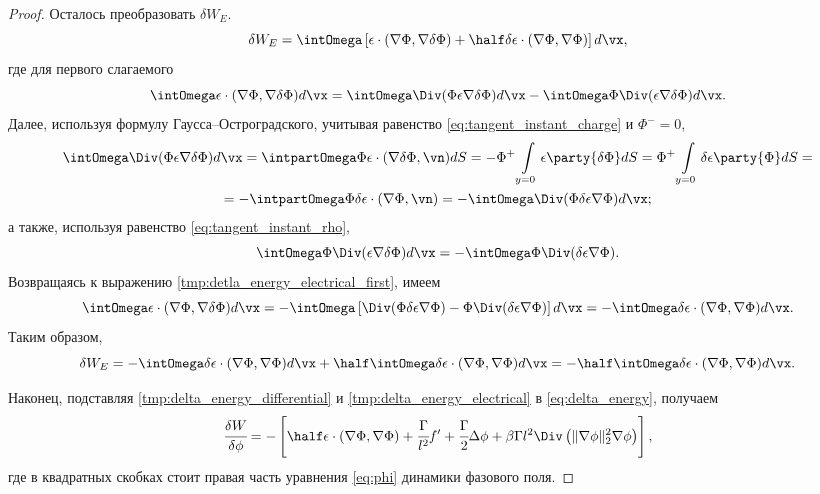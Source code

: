\begin{proof}
Осталось преобразовать $\delta W_E$.
\[
    \delta W_E = \intOmega \left[ \epsilon \cdot (\nabla \Phi, \nabla \delta \Phi) + \half \delta \epsilon \cdot (\nabla \Phi, \nabla \Phi) \right] d \vx,
\]
где для первого слагаемого
\begin{equation}
    \intOmega \epsilon \cdot (\nabla \Phi, \nabla \delta \Phi) d \vx = \intOmega \Div (\Phi \epsilon \nabla \delta \Phi) d \vx - \intOmega \Phi \Div (\epsilon \nabla \delta \Phi) d \vx.
    \label{tmp:detla_energy_electrical_first}
\end{equation}
Далее, используя формулу Гаусса--Остроградского, учитывая равенство \eqref{eq:tangent_instant_charge} и $\Phi^- = 0$,
\begin{multline*}
    \intOmega \Div (\Phi \epsilon \nabla \delta \Phi) d \vx = \intpartOmega \Phi \epsilon \cdot (\nabla \delta \Phi, \vn) dS = -\Phi^+ \int\limits_{y = 0} \epsilon \party{\delta \Phi} dS = \Phi^+ \int\limits_{y = 0} \delta \epsilon \party{\Phi} dS = \\ = -\intpartOmega \Phi \delta \epsilon \cdot (\nabla \Phi, \vn) = -\intOmega \Div(\Phi \delta \epsilon \nabla \Phi) d \vx;
\end{multline*}
а также, используя равенство \eqref{eq:tangent_instant_rho},
\[
    \intOmega \Phi \Div (\epsilon \nabla \delta \Phi) d \vx = -\intOmega \Phi \Div(\delta \epsilon \nabla \Phi).
\]
Возвращаясь к выражению \eqref{tmp:detla_energy_electrical_first}, имеем
\[
    \intOmega \epsilon \cdot (\nabla \Phi, \nabla \delta \Phi) d \vx = -\intOmega \left[ \Div(\Phi \delta \epsilon \nabla \Phi) - \Phi \Div(\delta \epsilon \nabla \Phi) \right] d \vx = -\intOmega \delta \epsilon \cdot (\nabla \Phi, \nabla \Phi) d \vx.
\]
Таким образом,
\begin{equation}
    \delta W_E = -\intOmega \delta \epsilon \cdot (\nabla \Phi, \nabla \Phi) d \vx + \half \intOmega \delta \epsilon \cdot (\nabla \Phi, \nabla \Phi) d \vx = -\half \intOmega \delta \epsilon \cdot (\nabla \Phi, \nabla \Phi) d \vx.
    \label{tmp:delta_energy_electrical}
\end{equation}

Наконец, подставляя \eqref{tmp:delta_energy_differential} и \eqref{tmp:delta_energy_electrical} в \eqref{eq:delta_energy}, получаем
\[
    \cfrac{\delta W}{\delta \phi} = -\left[ \half \epsilon \cdot (\nabla \Phi, \nabla \Phi) + \cfrac{\Gamma}{l^2} f' + \cfrac{\Gamma}{2} \Delta \phi + \beta \Gamma l^2 \Div \left(\| \nabla \phi \|_2^2 \nabla \phi \right) \right],
\]
где в квадратных скобках стоит правая часть уравнения \eqref{eq:phi} динамики фазового поля.
\end{proof}

